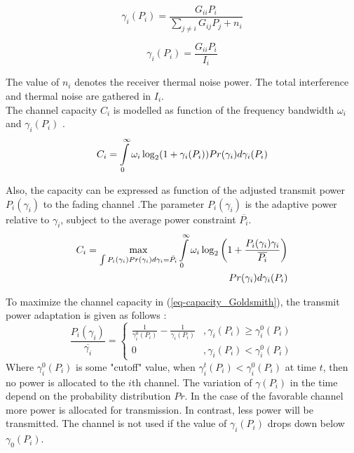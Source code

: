 \documentclass[conference]{IEEEtran}
\begin{document}
\begin{equation}
\label{eq-sinr}
\gamma_{i}(P_{i})=\frac{G_{ii}P_{i}}{\underset{j\neq i}{\sum}G_{ij}P_{j}+n_{i}}
\end{equation}

\[
\gamma_{i}(P_{i})=\frac{G_{ii}P_{i}}{I_{i}}
\]

The value of $n_{i}$ denotes the receiver thermal noise power. The total interference and thermal noise are gathered in $I_{i}$.\\

The channel capacity  $C_{i}$ is modelled as function of the frequency bandwidth $\omega_{i}$ and  $\gamma_{i}(P_{i})$   \cite{Shannon1948}. 
\[
C_{i}=\intop_{0}^{\infty}
 \omega_{i}\log_{2}(1+\gamma_{i}(P_{i}))Pr(\gamma_{i})d
 \gamma_{i}(P_{i})
\]

Also, the capacity can be expressed as function of the adjusted transmit power $P_{i}(\gamma_{i})$ to the fading channel \cite{Goldsmith1997}.The parameter $P_{i}(\gamma_{i})$ is the adaptive power relative to $\gamma_{i}$, subject to the average power constraint $\overline{P_{i}}$.
\begin{align}
\label{eq-capacity_Goldsmith}
C_{i}=\underset{\int P_{i}(\gamma_{i})Pr(\gamma_{i})d\gamma_{i}=\bar{P_{i}}}{\max}\intop_{0}^{\infty}\omega_{i}\log_{2}\left(1+\frac{P_{i}(\gamma_{i})\gamma_{i}}{\overline{P_{i}}}\right)\\
Pr(\gamma_{i})d\gamma_{i}(P_{i}) \nonumber
\end{align}
 
To maximize the channel capacity in (\ref{eq-capacity_Goldsmith}), the transmit power adaptation is given as follows : 
\begin{equation}
\label{Power_noise}
\frac{P_{i}(\gamma_{i})}{\overline{\gamma_{i}}}=\begin{cases}
\frac{1}{\gamma_{i}^{0}(P_{i})}-\frac{1}{\gamma_{i}(P_{i})} & ,\gamma_{i}(P_{i})\geqslant\gamma_{i}^{0}(P_{i})\\
0 & ,\gamma_{i}(P_{i})<\gamma_{i}^{0}(P_{i})
\end{cases}
\end{equation}
Where $\gamma_{i}^{0}(P_{i})$ is some "cutoff" value, when  $\gamma_{i}^{t}(P_{i})
 <\gamma_{i}^{0}(P_{i})$ at time $t$, then no power is allocated to the $i$th channel. The variation of $\gamma(P_{i})$ in the time depend on the probability distribution $Pr$. In the case of the favorable channel more power is allocated for transmission. In contrast, less power will be transmitted. The channel is not used if the value of $\gamma_{i}(P_{i})$ drops down below $\gamma_{0}(P_{i})$.
 
\end{document}
